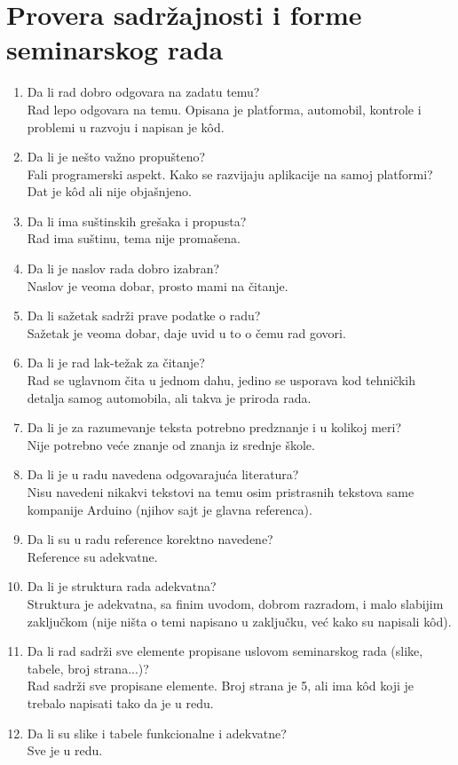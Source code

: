 \documentclass[a4paper]{article}
\begin{document}
	\section{Provera sadržajnosti i forme seminarskog rada}
	
	\begin{enumerate}
		\item Da li rad dobro odgovara na zadatu temu?\\ Rad lepo odgovara na temu. Opisana je platforma, automobil, kontrole i problemi u razvoju i napisan je k\^ od.
		\item Da li je nešto važno propušteno?\\ Fali programerski aspekt. Kako se razvijaju aplikacije na samoj platformi? Dat je k\^ od ali nije objašnjeno.
		\item Da li ima suštinskih grešaka i propusta?\\Rad ima suštinu, tema nije promašena.
		\item Da li je naslov rada dobro izabran?\\ Naslov je veoma dobar, prosto mami na čitanje.
		\item Da li sažetak sadrži prave podatke o radu?\\ Sažetak je veoma dobar, daje uvid u to o čemu rad govori.
		\item Da li je rad lak-težak za čitanje?\\ Rad se uglavnom čita u jednom dahu, jedino se usporava kod tehničkih detalja samog automobila, ali takva je priroda rada.
		\item Da li je za razumevanje teksta potrebno predznanje i u kolikoj meri?\\ Nije potrebno veće znanje od znanja iz srednje škole.
		\item Da li je u radu navedena odgovarajuća literatura?\\ Nisu navedeni nikakvi tekstovi na temu osim pristrasnih tekstova same kompanije Arduino (njihov sajt je glavna referenca).
		\item Da li su u radu reference korektno navedene?\\ Reference su adekvatne.
		\item Da li je struktura rada adekvatna?\\ Struktura je adekvatna, sa finim uvodom, dobrom razradom, i malo slabijim zaključkom (nije ništa o temi napisano u zaključku, već kako su napisali k\^ od).
		\item Da li rad sadrži sve elemente propisane uslovom seminarskog rada (slike, tabele, broj strana...)?\\ Rad sadrži sve propisane elemente. Broj strana je 5, ali ima k\^ od koji je trebalo napisati tako da je u redu.
		\item Da li su slike i tabele funkcionalne i adekvatne?\\ Sve je u redu.
	\end{enumerate}
	
\end{document}

